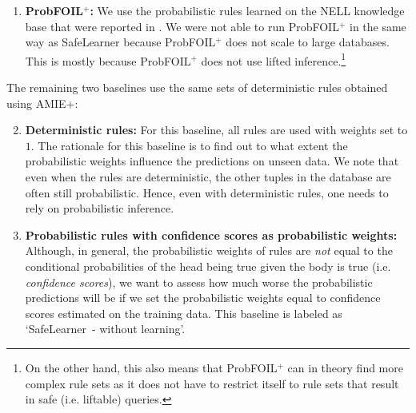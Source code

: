 \documentclass[akbc,twoside,11pt]{article}
\newcommand{\algorithmname}{SafeLearner\xspace}
\begin{document}
\begin{enumerate}
    \item {\bf ProbFOIL$^+$:} We use the probabilistic rules learned on the NELL knowledge base that were reported in \cite{DBLP:conf/ijcai/RaedtDTBV15}. We were not able to run ProbFOIL$^+$ in the same way as \algorithmname because ProbFOIL$^+$ does not scale to large databases. This is mostly because ProbFOIL$^+$ does not use lifted inference.\footnote{On the other hand, this also means that ProbFOIL$^+$ can in theory find more complex rule sets as it does not have to restrict itself to rule sets that result in safe (i.e. liftable) queries.}
\end{enumerate}


\noindent The remaining two baselines use the same sets of deterministic rules obtained using AMIE+:

\begin{enumerate}
    \setcounter{enumi}{1}
    \item {\bf Deterministic rules:} For this baseline, all rules are used with weights set to $1$. The rationale for this baseline is to find out to what extent the probabilistic weights influence the predictions on unseen data. We note that even when the rules are deterministic, the other tuples in the database are often still probabilistic. Hence, even with deterministic rules, one needs to rely on probabilistic inference. %
    \item {\bf Probabilistic rules with confidence scores as probabilistic weights:} Although, in general, the probabilistic weights of rules are {\em not} equal to the conditional probabilities of the head being true given the body is true (i.e. {\em confidence scores}), we want to assess how much worse the probabilistic predictions will be if we set the probabilistic weights equal to confidence scores estimated on the training data. This baseline is labeled as `\algorithmname\ - without learning'.
\end{enumerate}
\end{document}
